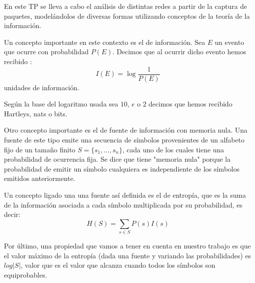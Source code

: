 En este TP se lleva a cabo el análisis de distintas redes a partir de
la captura de paquetes, modelándolos de diversas formas utilizando
conceptos de la teoría de la información.
 
 Un concepto importante en este contexto es el de información. Sea $E$
 un evento que ocurre con probabilidad $P(E)$. Decimos que al ocurrir
 dicho evento hemos recibido :
 $$
 I(E) = \log{\frac{1}{P(E)}}
 $$
 unidades de información.
 
Según la base del logaritmo usada sea $10$, $e$ o $2$ decimos que
hemos recibido Hartleys, nats o bits.
 
Otro concepto importante es el de fuente de información con memoria
nula. Una fuente de este tipo emite una secuencia de símbolos
provenientes de un alfabeto fijo de un tamaño finito $S
= \{s_1, \dots, s_n\}$, cada uno de los cuales tiene una probabilidad
de ocurrencia fija. Se dice que tiene "memoria nula" porque la
probabilidad de emitir un símbolo cualquiera es independiente de los
símbolos emitidos anteriormente.

Un concepto ligado una una fuente así definida es el de entropía, que
es la suma de la información asociada a cada símbolo multiplicada por
su probabilidad, es decir:
$$
H(S) = \sum_{s \in S} P(s)I(s)
$$

Por último, una propiedad que vamos a tener en cuenta en nuestro
trabajo es que el valor máximo de la entropía (dada una fuente y
variando las probabilidades) es $log |S|$, valor que es el valor que
alcanza cuando todos los símbolos son equiprobables.

\blindtext
